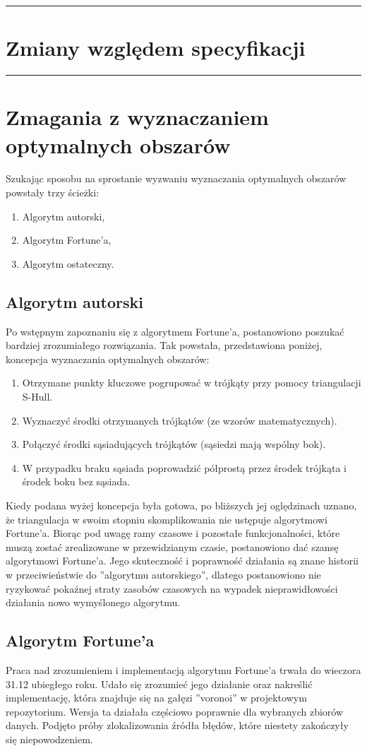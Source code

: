 \documentclass[a4paper,11pt]{article}
\newcommand{\linia}{\rule{\linewidth}{0.4mm}}
\begin{document}
\noindent\linia
\section{Zmiany względem specyfikacji}

\noindent\linia
\section{Zmagania z wyznaczaniem optymalnych obszarów}
Szukając sposobu na sprostanie wyzwaniu wyznaczania optymalnych obszarów powstały trzy ścieżki:
\begin{enumerate}
\item Algorytm autorski,
\item Algorytm Fortune'a,
\item Algorytm ostateczny.
\end{enumerate}
\subsection{Algorytm autorski}
Po wstępnym zapoznaniu się z algorytmem Fortune'a, postanowiono poszukać bardziej zrozumiałego rozwiązania.
Tak powstała, przedstawiona poniżej, koncepcja wyznaczania optymalnych obszarów:
\begin{enumerate}
\item Otrzymane punkty kluczowe pogrupować w trójkąty przy pomocy triangulacji S-Hull.
\item Wyznaczyć środki otrzymanych trójkątów (ze wzorów matematycznych).
\item Połączyć środki sąsiadujących trójkątów (sąsiedzi mają wspólny bok).
\item W przypadku braku sąsiada poprowadzić półprostą przez środek trójkąta i środek boku bez sąsiada.
\end{enumerate}
Kiedy podana wyżej koncepcja była gotowa, po bliższych jej oględzinach uznano, że triangulacja w swoim stopniu skomplikowania nie ustępuje algorytmowi Fortune'a.
Biorąc pod uwagę ramy czasowe i pozostałe funkcjonalności, które muszą zostać zrealizowane w przewidzianym czasie, postanowiono dać szansę algorytmowi Fortune'a. Jego skuteczność i poprawność działania są znane historii w przeciwieństwie do ''algorytmu autorskiego'', dlatego postanowiono nie ryzykować pokaźnej straty zasobów czasowych na wypadek nieprawidłowości działania nowo wymyślonego algorytmu.
\subsection{Algorytm Fortune'a}
Praca nad zrozumieniem i implementacją algorytmu Fortune'a trwała do wieczora 31.12 ubiegłego roku.
Udało się zrozumieć jego działanie oraz nakreślić implementację, która znajduje się na gałęzi ''voronoi'' w projektowym repozytorium. Wersja ta działała częściowo poprawnie dla wybranych zbiorów danych. Podjęto próby zlokalizowania źródła błędów, które niestety zakończyły się niepowodzeniem.
\end{document}
